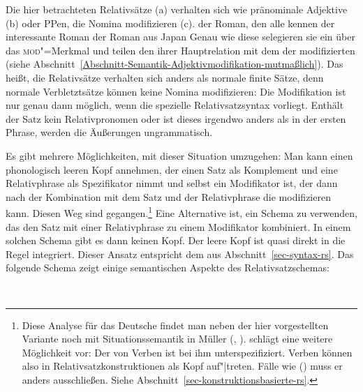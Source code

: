Die hier betrachteten Relativsätze (a) verhalten sich wie pränominale
Adjektive (b) oder PPen, die Nomina modifizieren (c).
\eal
\ex der Roman, den alle kennen
\ex der interessante Roman
\ex der Roman aus Japan
\zl
Genau wie diese selegieren sie ein \nbar über das \textsc{mod}"=Merkmal und teilen den \ltopw ihrer
Hauptrelation mit dem der modifizierten \nbar (siehe Abschnitt~\ref{Abschnitt-Semantik-Adjektivmodifikation-mutmaßlich}).
Das heißt, die Relativsätze verhalten sich anders als normale finite Sätze,
denn normale Verbletztsätze können keine Nomina modifizieren:
\eal
{}
\zl
{}
Die Modifikation ist nur genau dann möglich, wenn die spezielle Relativsatzsyntax vorliegt.
Enthält der Satz kein Relativpronomen oder ist dieses irgendwo anders als in der ersten
Phrase, werden die Äußerungen ungrammatisch.

Es gibt mehrere Möglichkeiten, mit dieser Situation umzugehen: Man kann
einen phonologisch leeren Kopf annehmen, der einen Satz als Komplement und eine Relativphrase als Spezifikator nimmt 
und selbst ein Modifikator ist, der dann nach der Kombination mit dem Satz und der Relativphrase
die \nbar modifizieren kann. Diesen Weg sind \citet[Kapitel~5]{ps2} gegangen.\footnote{
  Diese Analyse für das Deutsche findet man neben der hier vorgestellten Variante noch mit Situationssemantik
  in Müller (\citeyear[Kapitel~10.3]{Mueller99a}, \citeyear[Abschnitt~2.7]{Mueller99b}).
  \citet{Sag97a} schlägt eine weitere Möglichkeit vor: Der \modw von Verben ist
  bei ihm unterspezifiziert. Verben können also in Relativsatzkonstruktionen
  als Kopf auf"|treten. Fälle wie () muss er anders ausschließen. Siehe Abschnitt~\ref{sec-konstruktionsbasierte-rs}.%
}
Eine Alternative ist, ein Schema zu verwenden, das den Satz mit einer Relativphrase zu einem
Modifikator kombiniert. In einem solchen Schema gibt es dann keinen
Kopf. Der leere Kopf ist quasi direkt in die Regel integriert. Dieser Ansatz entspricht dem aus Abschnitt~\ref{sec-syntax-rs}.
Das folgende Schema zeigt einige semantischen Aspekte des Relativsatzschemas:


\begin{schema}
\label{rs-schema-sem}
 \impl\\
\end{schema}

